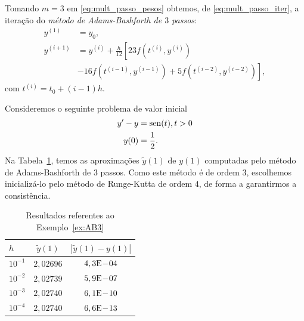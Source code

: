 Tomando $m=3$ em \eqref{eq:mult_passo_pesos} obtemos, de \eqref{eq:mult_passo_iter}, a iteração do \emph{método de Adams-Bashforth de $3$ passos}:
\begin{align}
  y^{(1)} &= y_0,\\
  y^{(i+1)} &= y^{(i)} + \frac{h}{12}\left[23f(t^{(i)},y^{(i)}) \right.\nonumber\\
              &\left. - 16f(t^{(i-1)},y^{(i-1)}) + 5f(t^{(i-2)},y^{(i-2)})\right],
\end{align}
com $t^{(i)} = t_0 + (i-1)h$.

\begin{ex}\label{ex:AB3}
  Consideremos o seguinte problema de valor inicial
  \begin{align}
    y' - y &= \operatorname{sen}(t), t>0\\
    y(0) &= \frac{1}{2}.
  \end{align}
  Na Tabela~\ref{tab:ex_AB3}, temos as aproximações $\tilde{y}(1)$ de $y(1)$ computadas pelo método de Adams-Bashforth de $3$ passos. Como este método é de ordem $3$, escolhemos inicializá-lo pelo método de Runge-Kutta de ordem $4$, de forma a garantirmos a consistência.
 
  \begin{table}[h!]
    \centering
    \begin{tabular}{l|cc}
      $h$ & $\tilde{y}(1)$ & $|\tilde{y}(1)-y(1)|$\\\hline
      $10^{-1}$ & $2,02696$ & $4,3\mathrm{E}\!-\!04$ \\
      $10^{-2}$ & $2,02739$ & $5,9\mathrm{E}\!-\!07$ \\
      $10^{-3}$ & $2,02740$ & $6,1\mathrm{E}\!-\!10$ \\
      $10^{-4}$ & $2,02740$ & $6,6\mathrm{E}\!-\!13$ \\\hline
   \end{tabular}
    \caption{Resultados referentes ao Exemplo~\ref{ex:AB3}}
    \label{tab:ex_AB3}
  \end{table}






\end{ex}

